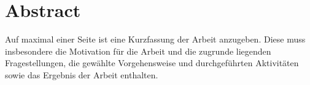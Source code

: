\section*{Abstract}

%

Auf maximal einer Seite ist eine Kurzfassung der Arbeit anzugeben. Diese muss insbesondere die Motivation für die Arbeit und die zugrunde liegenden Fragestellungen, die gewählte Vorgehensweise und durchgeführten Aktivitäten sowie das Ergebnis der Arbeit enthalten. 

